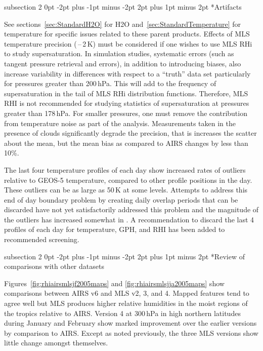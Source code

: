 \documentclass[11pt,draft]{report}
\makeatletter
\renewcommand{\subsection}{\@startsection%
  {subsection}%
  {2}%
  {0pt}%
  {-2pt plus -1pt minus -2pt}%
  {2pt plus 1pt minus 2pt}%
  {\large\sffamily\fontseries{sb}\selectfont\flushleft\color{SectionColor}\figureversion{tabular}}}%
\makeatother
\begin{document}
\subsection*{Artifacts}

See sections~\ref{sec:StandardH2O} for H\cs2O
and~\ref{sec:StandardTemperature} for temperature for specific issues
related to these parent products. Effects of MLS temperature precision
(\,--\,2\,K) must be considered if one wishes to use MLS
RHi to study supersaturation. In simulation studies, systematic errors
(such as tangent pressure retrieval and errors), in addition to
introducing biases, also increase variability in differences with
respect to a ``truth'' data set particularly for pressures greater than
200\,hPa. This will add to the frequency of supersaturation in the tail
of MLS RHi distribution functions.  Therefore, MLS RHI is not
recommended for studying statistics of supersaturation at pressures
greater than 178\,hPa. For smaller pressures, one must remove the
contribution from temperature noise as part of the analysis.
Measurements taken in the presence of clouds significantly degrade the
precision, that is increases the scatter about the mean, but the mean
bias as compared to AIRS changes by less than 10\%.

The last four temperature profiles of each day show increased rates of
outliers relative to GEOS-5 temperature, compared to other profile
positions in the day.  These outliers can be as large as 50\,K at some
levels.  Attempts to address this end of day boundary problem by
creating daily overlap periods that can be discarded have not yet
satisfactorily addressed this problem and the magnitude of the outliers
has increased somewhat in \thisv.  A recommendation to discard the last
4 profiles of each day for temperature, GPH, and RHI has been added to
recommended screening.


\subsection*{Review of comparisons with other datasets}

Figures~\ref{fig:rhiairsmlsjf2005maps} and
\ref{fig:rhiairsmlsjja2005maps} show comparisons between AIRS v6 and MLS
v2, 3, and 4. Mapped features tend to agree well but MLS produces higher
relative humidities in the moist regions of the tropics relative to
AIRS. Version 4 at 300\,hPa in high northern latitudes during January
and February show marked improvement over the earlier versions by
comparison to AIRS\@. Except as noted previously, the three MLS versions
show little change amongst themselves.
\end{document}
